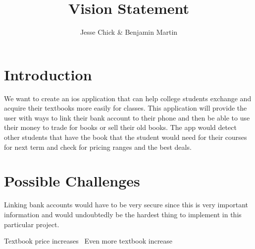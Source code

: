 \documentclass[12pt]{article}
\title{Vision Statement}
\author{Jesse Chick & Benjamin Martin}
\begin{document}
\maketitle
\tableofcontents



\section{Introduction}
We want to create an ios application that can help college students exchange and acquire their textbooks more easily for classes. This application will provide the user with ways to link their bank account to their phone and then be able to use their money to trade for books or sell their old books. The app would detect other students that have the book that the student would need for their courses for next term and check for pricing ranges and the best deals.

\section{Possible Challenges}

Linking bank accounts would have to be very secure since this is very important information and would undoubtedly be the hardest thing to implement in this particular project.


Textbook price increases~\cite{bookhuff}
Even more textbook increase~\cite{booknbc}




\end{document}
